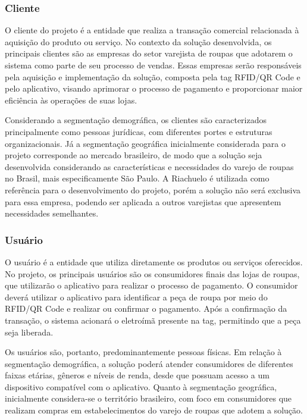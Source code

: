 \subsubsection{Cliente}
\label{subsubsec:cliente}

O cliente do projeto é a entidade que realiza a transação comercial relacionada à aquisição do produto ou serviço. No contexto da solução desenvolvida, os principais clientes são as empresas do setor varejista de roupas que adotarem o sistema como parte de seu processo de vendas. Essas empresas serão responsáveis pela aquisição e implementação da solução, composta pela tag RFID/QR Code e pelo aplicativo, visando aprimorar o processo de pagamento e proporcionar maior eficiência às operações de suas lojas.

Considerando a segmentação demográfica, os clientes são caracterizados principalmente como pessoas jurídicas, com diferentes portes e estruturas organizacionais. Já a segmentação geográfica inicialmente considerada para o projeto corresponde ao mercado brasileiro, de modo que a solução seja desenvolvida considerando as características e necessidades do varejo de roupas no Brasil, mais especificamente São Paulo. A Riachuelo é utilizada como referência para o desenvolvimento do projeto, porém a solução não será exclusiva para essa empresa, podendo ser aplicada a outros varejistas que apresentem necessidades semelhantes.

\subsubsection{Usuário}
\label{subsubsec:usuario}

O usuário é a entidade que utiliza diretamente os produtos ou serviços oferecidos. No projeto, os principais usuários são os consumidores finais das lojas de roupas, que utilizarão o aplicativo para realizar o processo de pagamento. O consumidor deverá utilizar o aplicativo para identificar a peça de roupa por meio do RFID/QR Code e realizar ou confirmar o pagamento. Após a confirmação da transação, o sistema acionará o eletroímã presente na tag, permitindo que a peça seja liberada.

Os usuários são, portanto, predominantemente pessoas físicas. Em relação à segmentação demográfica, a solução poderá atender consumidores de diferentes faixas etárias, gêneros e níveis de renda, desde que possuam acesso a um dispositivo compatível com o aplicativo. Quanto à segmentação geográfica, inicialmente considera-se o território brasileiro, com foco em consumidores que realizam compras em estabelecimentos do varejo de roupas que adotem a solução.

